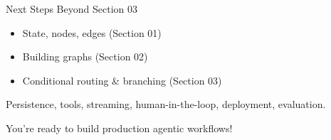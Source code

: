 \documentclass[aspectratio=169,11pt]{beamer}
\begin{document}
\begin{frame}[t]{Next Steps Beyond Section 03}
\setlength{\itemsep}{1pt}
\vspace{0.1cm}

\begin{tipbox}
\setlength{\itemsep}{1pt}
\begin{itemize}
  \item State, nodes, edges (Section 01)
  \item Building graphs (Section 02)
  \item Conditional routing \& branching (Section 03)
\end{itemize}
\end{tipbox}

\vspace{0.15cm}

\begin{conceptbox}
Persistence, tools, streaming, human-in-the-loop, deployment, evaluation.
\end{conceptbox}

\vspace{0.15cm}

You're ready to build production agentic workflows!
\end{frame}
\end{document}
